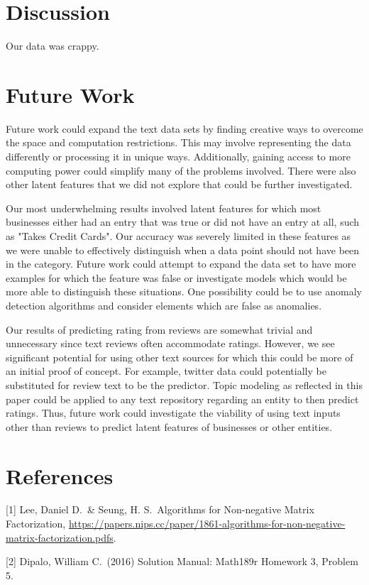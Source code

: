 \documentclass{article}
\begin{document}
\section{Discussion}

Our data was crappy.

\section{Future Work}

Future work could expand the text data sets by finding creative ways to overcome the space and computation restrictions.  This may involve representing the data differently or processing it in unique ways.  Additionally, gaining access to more computing power could simplify many of the problems involved.  There were also other latent features that we did not explore that could be further investigated.

Our most underwhelming results involved latent features for which most businesses either had an entry that was true or did not have an entry at all, such as "Takes Credit Cards".  Our accuracy was severely limited in these features as we were unable to effectively distinguish when a data point should not have been in the category.  Future work could attempt to expand the data set to have more examples for which the feature was false or investigate models which would be more able to distinguish these situations.  One possibility could be to use anomaly detection algorithms and consider elements which are false as anomalies.

Our results of predicting rating from reviews are somewhat trivial and unnecessary since text reviews often accommodate ratings.  However, we see significant potential for using other text sources for which this could be more of an initial proof of concept.  For example, twitter data could potentially be substituted for review text to be the predictor.  Topic modeling as reflected in this paper could be applied to any text repository regarding an entity to then predict ratings.  Thus, future work could investigate the viability of using text inputs other than reviews to predict latent features of businesses or other entities.  

\section*{References}

[1] Lee, Daniel D.\ \& Seung, H. S.\ Algorithms for Non-negative Matrix Factorization, \url{https://papers.nips.cc/paper/1861-algorithms-for-non-negative-matrix-factorization.pdfs}.

[2] Dipalo, William C.\  (2016) Solution Manual: Math189r Homework 3, Problem 5.
\end{document}
